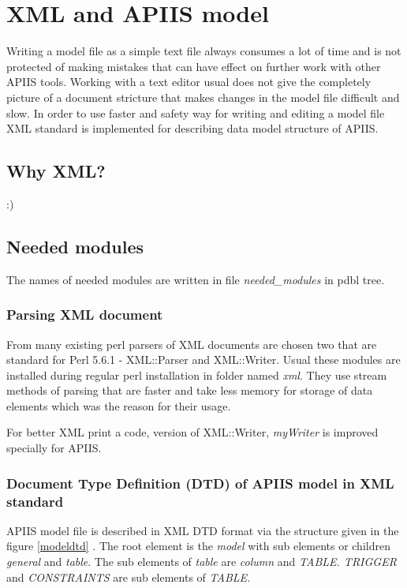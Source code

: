 \chapter{XML and APIIS model}

Writing a model file as a simple text file always consumes a lot of
time and is not protected of making mistakes that can have effect
on further work with other APIIS tools. Working with a text editor
usual does not give the completely picture of a document stricture
that makes changes in the model file difficult and slow. In order
to use faster and safety way for writing and editing a model file
XML standard is implemented for describing data model structure of
APIIS. 


\section{Why XML?}

:) 


\section{Needed modules}

The names of needed modules are written in file \emph{needed\_modules}
in pdbl tree. 


\subsection{Parsing XML document}

From many existing perl parsers of XML documents are chosen two that
are standard for Perl 5.6.1 - XML::Parser and XML::Writer. Usual these
modules are installed during regular perl installation in folder named
\emph{xml}. They use stream methods of parsing that are faster and
take less memory for storage of data elements which was the reason
for their usage.

For better XML print a code, version of XML::Writer, \emph{myWriter}
is improved specially for APIIS.


\subsection{Document Type Definition (DTD) of APIIS model in XML standard }

APIIS model file is described in XML DTD format via the structure
given in the figure \ref{modeldtd} . The root element is the \emph{model}
with sub elements or children \emph{general} and \emph{table}. The
sub elements of \emph{table} are \emph{column} and \emph{TABLE. TRIGGER}
and \emph{CONSTRAINTS} are sub elements of \emph{TABLE.}

